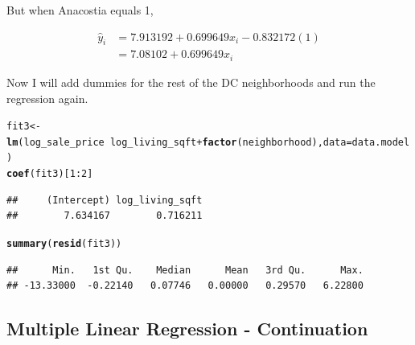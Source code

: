 \documentclass[10pt]{article}\usepackage[]{graphicx}\usepackage[]{color}
\makeatletter
\newcommand{\hlnum}[1]{\textcolor[rgb]{0.686,0.059,0.569}{#1}}%
\newcommand{\hlopt}[1]{\textcolor[rgb]{0,0,0}{#1}}%
\newcommand{\hlstd}[1]{\textcolor[rgb]{0.345,0.345,0.345}{#1}}%
\newcommand{\hlkwb}[1]{\textcolor[rgb]{0.69,0.353,0.396}{#1}}%
\newcommand{\hlkwc}[1]{\textcolor[rgb]{0.333,0.667,0.333}{#1}}%
\newcommand{\hlkwd}[1]{\textcolor[rgb]{0.737,0.353,0.396}{\textbf{#1}}}%
\newenvironment{kframe}{%
 \def\at@end@of@kframe{}%
 \ifinner\ifhmode%
  \def\at@end@of@kframe{\end{minipage}}%
  \begin{minipage}{\columnwidth}%
 \fi\fi%
 \def\FrameCommand##1{\hskip\@totalleftmargin \hskip-\fboxsep
 \colorbox{shadecolor}{##1}\hskip-\fboxsep
     \hskip-\linewidth \hskip-\@totalleftmargin \hskip\columnwidth}%
 \MakeFramed {\advance\hsize-\width
   \@totalleftmargin\z@ \linewidth\hsize
   \@setminipage}}%
 {\par\unskip\endMakeFramed%
 \at@end@of@kframe}
\newenvironment{knitrout}{}{} %
\makeatother
\begin{document}
But when Anacostia equals 1,

\begin{align*}
\hat{y}_i &= 7.913192 + 0.699649 x_i - 0.832172(1) \\
  &= 7.08102 + 0.699649 x_i
\end{align*}

Now I will add dummies for the rest of the DC neighborhoods and run the regression again.

\begin{knitrout}\small
{}\color{fgcolor}\begin{kframe}
\begin{alltt}
\hlstd{fit3}\hlkwb{<-}\hlkwd{lm}\hlstd{(log_sale_price} \hlopt{~} \hlstd{log_living_sqft} \hlopt{+} \hlkwd{factor}\hlstd{(neighborhood),}\hlkwc{data}\hlstd{=data.model)}
\hlkwd{coef}\hlstd{(fit3)[}\hlnum{1}\hlopt{:}\hlnum{2}\hlstd{]}
\end{alltt}
\begin{verbatim}
##     (Intercept) log_living_sqft 
##        7.634167        0.716211
\end{verbatim}
\begin{alltt}
\hlkwd{summary}\hlstd{(}\hlkwd{resid}\hlstd{(fit3))}
\end{alltt}
\begin{verbatim}
##      Min.   1st Qu.    Median      Mean   3rd Qu.      Max. 
## -13.33000  -0.22140   0.07746   0.00000   0.29570   6.22800
\end{verbatim}
\end{kframe}
\end{knitrout}

\subsection*{Multiple Linear Regression - Continuation }


\newpage

\end{document}
